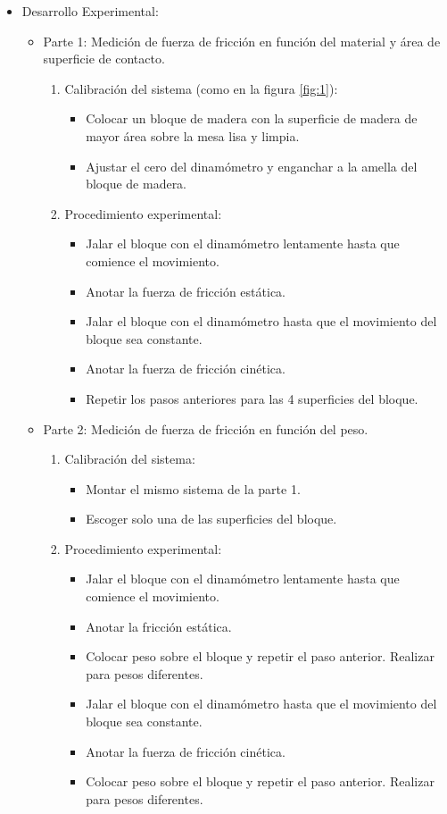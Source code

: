 \documentclass{article}
\begin{document}
\begin{multicols}{2}
	\begin{itemize}
\item Desarrollo Experimental:
\begin{itemize}
\item Parte 1: Medición de fuerza de fricción en función del material y área de superficie de contacto.
\begin{enumerate}
\item Calibración del sistema (como en la figura \ref{fig:1}):
\begin{itemize}
\item Colocar un bloque de madera con la superficie de madera de mayor área sobre la mesa lisa y limpia.
\item Ajustar el cero del dinamómetro y enganchar a la amella del bloque de madera.
\end{itemize}
\item Procedimiento experimental:
\begin{itemize}
\item Jalar el bloque con el dinamómetro lentamente hasta que comience el movimiento.
\item Anotar la fuerza de fricción estática.
\item Jalar el bloque con el dinamómetro hasta que el movimiento del bloque sea constante.
\item Anotar la fuerza de fricción cinética.
\item Repetir los pasos anteriores para las 4 superficies del bloque.
\end{itemize}
\end{enumerate}
\item Parte 2: Medición de fuerza de fricción en función del peso.
\begin{enumerate}
\item Calibración del sistema:
\begin{itemize}
\item Montar el mismo sistema de la parte 1.
\item Escoger solo una de las superficies del bloque.
\end{itemize}
\item Procedimiento experimental:
\begin{itemize}
\item Jalar el bloque con el dinamómetro lentamente hasta que comience el movimiento.
\item Anotar la fricción estática.
\item Colocar peso sobre el bloque y repetir el paso anterior. Realizar para pesos diferentes.
\item Jalar el bloque con el dinamómetro hasta que el movimiento del bloque sea constante.
\item Anotar la fuerza de fricción cinética.
\item Colocar peso sobre el bloque y repetir el paso anterior. Realizar para pesos diferentes.
\end{itemize}
\end{enumerate}
\end{itemize}
\end{itemize}


\end{multicols}
\end{document}

